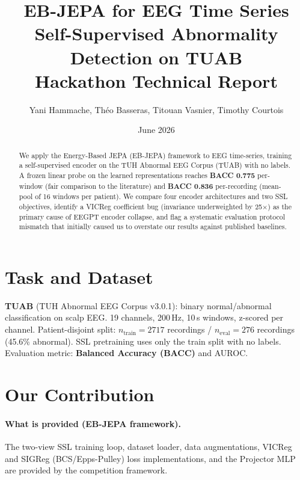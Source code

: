 \documentclass[10pt,a4paper]{article}
\title{\textbf{EB-JEPA for EEG Time Series}\\
  \large Self-Supervised Abnormality Detection on TUAB\\[4pt]
  \normalsize Hackathon Technical Report}
\author{Yani Hammache, Théo Basseras, Titouan Vasnier, Timothy Courtois}
\date{June 2026}
\begin{document}
\maketitle
\begin{abstract}
We apply the Energy-Based JEPA (EB-JEPA) framework to EEG time-series, training a
self-supervised encoder on the TUH Abnormal EEG Corpus (TUAB) with no labels.
A frozen linear probe on the learned representations reaches
\textbf{BACC 0.775} per-window (fair comparison to the literature)
and \textbf{BACC 0.836} per-recording (mean-pool of 16 windows per patient).
We compare four encoder architectures and two SSL objectives, identify a
VICReg coefficient bug (invariance underweighted by 25$\times$) as the primary
cause of EEGPT encoder collapse, and flag a systematic evaluation protocol
mismatch that initially caused us to overstate our results against published baselines.
\end{abstract}

\section{Task and Dataset}
\textbf{TUAB} (TUH Abnormal EEG Corpus v3.0.1): binary normal/abnormal classification
on scalp EEG. 19 channels, 200\,Hz, 10\,s windows, z-scored per channel.
Patient-disjoint split: $n_{\text{train}}=2717$ recordings / $n_{\text{eval}}=276$ recordings
(45.6\% abnormal). SSL pretraining uses only the train split with no labels.
Evaluation metric: \textbf{Balanced Accuracy (BACC)} and AUROC.

\section{Our Contribution}

\paragraph{What is provided (EB-JEPA framework).}
The two-view SSL training loop, dataset loader, data augmentations, VICReg and SIGReg
(BCS/Epps-Pulley) loss implementations, and the Projector MLP are provided by the
competition framework.
\end{document}
